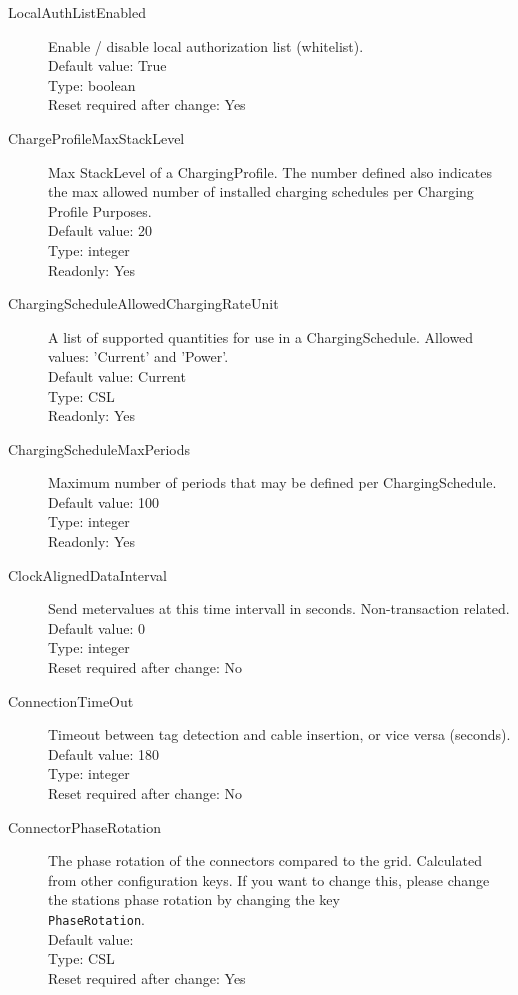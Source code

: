 \begin{description}
\item[LocalAuthListEnabled] Enable / disable local authorization list (whitelist).\\
  Default value: True\\
  Type: boolean\\
  Reset required after change: Yes\\

\item[ChargeProfileMaxStackLevel] Max StackLevel of a ChargingProfile. The number defined also indicates the max allowed number of installed charging schedules per Charging Profile Purposes.\\
  Default value: 20\\
  Type: integer\\
  Readonly: Yes\\

\item[ChargingScheduleAllowedChargingRateUnit] A list of supported quantities for use in a ChargingSchedule. Allowed values: 'Current' and 'Power'.\\
  Default value: Current\\
  Type: CSL\\
  Readonly: Yes\\

\item[ChargingScheduleMaxPeriods] Maximum number of periods that may be defined per ChargingSchedule.\\
  Default value: 100\\
  Type: integer\\
  Readonly: Yes\\

\item[ClockAlignedDataInterval] Send metervalues at this time intervall in seconds. Non-transaction related.\\
  Default value: 0\\
  Type: integer\\
  Reset required after change: No\\

\item[ConnectionTimeOut] Timeout between tag detection and cable insertion, or vice versa (seconds).\\
  Default value: 180\\
  Type: integer\\
  Reset required after change: No\\

\item[ConnectorPhaseRotation] The phase rotation of the connectors compared to the grid. Calculated from other configuration keys. If you want to change this, please change the stations phase rotation by changing the key \\\verb|PhaseRotation|.\\
  Default value: \\
  Type: CSL\\
  Reset required after change: Yes\\


\end{description}
